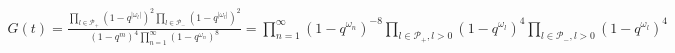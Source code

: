 \begin{equation}
\begin{split}
  G(t) %
= \frac{\prod_{l\in\mathcal{P}_+}(1-q^{|\omega_l|})^2 
    \prod_{l\in\mathcal{P}_-}(1-q^{|\omega_l|})^2}
  {(1-q^m)^4 \prod_{n=1}^{\infty}(1-q^{\omega_n})^8}
= \prod_{n=1}^{\infty}(1-q^{\omega_n})^{-8}
  \prod_{l\in\mathcal{P}_+, l>0} (1-q^{\omega_l})^4
  \prod_{l\in\mathcal{P}_-, l>0} (1-q^{\omega_l})^4  
\end{split}
\end{equation}

